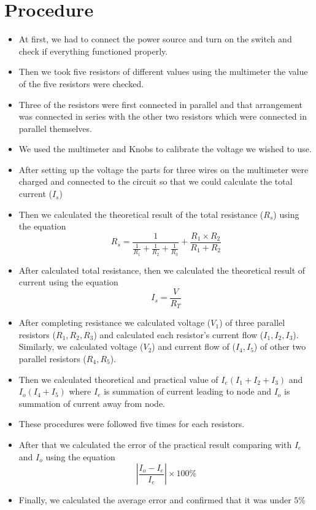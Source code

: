 \documentclass[a4paper,12pt]{article}
\begin{document}
\section*{Procedure}
\begin{itemize}
 \item At first, we had to connect the power source and turn on the switch and check if everything functioned properly.
 \item Then we took five resistors of different values using the multimeter the value of the five resistors were checked.
\item Three of the resistors were first connected in parallel and that arrangement was connected in series with the other two resistors which were connected in parallel themselves. 
 
 \item We used the multimeter and Knobs to calibrate the voltage we wished to use.
 \item After setting up the voltage the parts for three wires on the multimeter were charged and connected to the circuit so that we could calculate the total current ($I_s$)
 \item Then we calculated the theoretical result of the total resistance ($R_s$) using the equation
\begin{equation}
 R_s=\frac{1}{\frac{1}{R_1}+\frac{1}{R_2}+\frac{1}{R_3}}+\frac{R_1\times R_2}{R_1+R_2}
\end{equation}
\item After calculated total resistance, then we calculated the theoretical result of current using the equation
\begin{equation}
 I_s=\frac{V}{R_T}
\end{equation}
\item After completing resistance we calculated voltage ($V_1$) of three parallel resistors ($R_1, R_2, R_3$) and calculated each resistor's current flow ($I_1, I_2, I_3$). Similarly, we calculated voltage ($V_2$) and current flow of ($I_4, I_5$) of other two parallel resistors ($R_4, R_5$).
\item Then we calculated theoretical and practical value of $I_e (I_1+I_2+I_3)$ and $I_o (I_4+I_5)$ where $I_e$ is summation of current leading to node and $I_o$ is summation of current away from node.
\item These procedures were followed five times for each resistors.
\item After that we calculated the error of the practical result comparing with $I_e$ and $I_o$ using the equation
\begin{equation}
 \left|\frac{I_o-I_e}{I_e}\right|\times 100\%
\end{equation}
\item Finally, we calculated the average error and confirmed that it was under $5\%$


\end{itemize}
\end{document}
